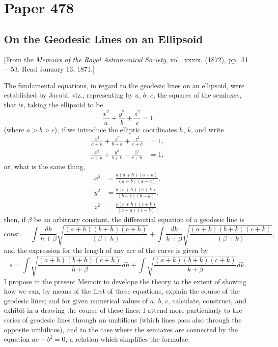 \documentclass[11pt,a4paper]{article}
\begin{document}
\newpage

\section*{Paper 478}

\subsection*{On the Geodesic Lines on an Ellipsoid}

\begin{center}
[From the \textit{Memoirs of the Royal Astronomical Society}, vol.~xxxix. (1872), pp.~31---53. Read January 13, 1871.]
\end{center}

The fundamental equations, in regard to the geodesic lines on an ellipsoid, were established by Jacobi, viz., representing by $a$, $b$, $c$, the squares of the semiaxes, that is, taking the ellipsoid to be
\[
\frac{x^{2}}{a} + \frac{y^{2}}{b} + \frac{z^{2}}{c} = 1
\]
(where $a > b > c$), if we introduce the elliptic coordinates $h$, $k$, and write
\begin{align*}
\frac{x^{2}}{a+h} + \frac{y^{2}}{b+h} + \frac{z^{2}}{c+h} &= 1, \\
\frac{x^{2}}{a+k} + \frac{y^{2}}{b+k} + \frac{z^{2}}{c+k} &= 1,
\end{align*}
or, what is the same thing,
\begin{align*}
x^{2} &= \frac{a(a+h)(a+k)}{(a-b)(a-c)}, \\
y^{2} &= \frac{b(b+h)(b+k)}{(b-c)(b-a)}, \\
z^{2} &= \frac{c(c+h)(c+k)}{(c-a)(c-b)},
\end{align*}
then, if $\beta$ be an arbitrary constant, the differential equation of a geodesic line is
\begin{equation}\tag{1}
\text{const.} = \int \frac{dh}{h+\beta} \sqrt{\frac{(a+h)(b+h)(c+h)}{(\beta+h)}} + \int \frac{dk}{k+\beta} \sqrt{\frac{(a+k)(b+k)(c+k)}{(\beta+k)}},
\end{equation}
and the expression for the length of any arc of the curve is given by
\begin{equation}\tag{2}
s = \int \sqrt{\frac{(a+h)(b+h)(c+h)}{h+\beta}} dh + \int \sqrt{\frac{(a+k)(b+k)(c+k)}{k+\beta}} dk.
\end{equation}
I propose in the present Memoir to develope the theory to the extent of showing how we can, by means of the first of these equations, explain the course of the geodesic lines; and for given numerical values of $a$, $b$, $c$, calculate, construct, and exhibit in a drawing the course of these lines: I attend more particularly to the series of geodesic lines through an umbilicus (which lines pass also through the opposite umbilicus), and to the case where the semiaxes are connected by the equation $ac - b^{2} = 0$, a relation which simplifies the formulae.
\end{document}

